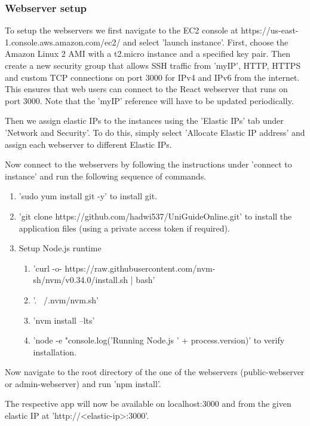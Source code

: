 \documentclass[12pt]{article}
\begin{document}
\subsubsection{Webserver setup}

To setup the webservers we first navigate to the EC2 console at https://us-east-1.console.aws.amazon.com/ec2/ and select 'launch instance'. First, choose the Amazon Linux 2 AMI with a t2.micro instance and a specified key pair. Then create a new security group that allows SSH traffic from 'myIP', HTTP, HTTPS and custom TCP connections on port 3000 for IPv4 and IPv6 from the internet. This ensures that web users can connect to the React webserver that runs on port 3000. Note that the 'myIP' reference will have to be updated periodically. 

Then we assign elastic IPs to the instances using the 'Elastic IPs' tab under 'Network and Security'. To do this, simply select 'Allocate Elastic IP address' and assign each webserver to different Elastic IPs.

Now connect to the webservers by following the instructions under 'connect to instance' and run the following sequence of commands. 

\begin{enumerate}
    \item 'sudo yum install git -y' to install git.
    \item 'git clone https://github.com/hadwi537/UniGuideOnline.git' to install the application files (using a private access token if required).
    \item Setup Node.js runtime
    \begin{enumerate}
        \item 'curl -o- https://raw.githubusercontent.com/nvm-sh/nvm/v0.34.0/install.sh | bash'
        \item '. ~/.nvm/nvm.sh'
        \item 'nvm install --lts'
        \item 'node -e "console.log('Running Node.js ' + process.version)' to verify installation.
    \end{enumerate}
\end{enumerate}

Now navigate to the root directory of the one of the webservers (public-webserver or admin-webserver) and run 'npm install'.

The respective app will now be available on localhost:3000 and from the given elastic IP at 'http://<elastic-ip>:3000'.
\end{document}
